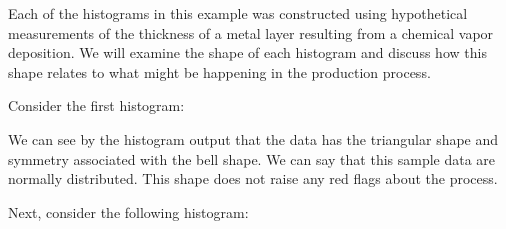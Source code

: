 \documentclass{ximera}
\begin{document}
\begin{example}\label{ex:histogram1}


Each of the histograms in this example was constructed using hypothetical measurements of the thickness of a metal layer resulting from a chemical vapor deposition.  We will examine the shape of each histogram and discuss how this shape relates to what might be happening in the production process.

Consider the first histogram:

\begin{center}
      \end{center}

We can see by the histogram output that the data has the triangular shape and symmetry associated with the bell shape. We can say that this sample data are normally distributed.  This shape does not raise any red flags about the process.

Next, consider the following histogram:


\end{example}
\end{document}
